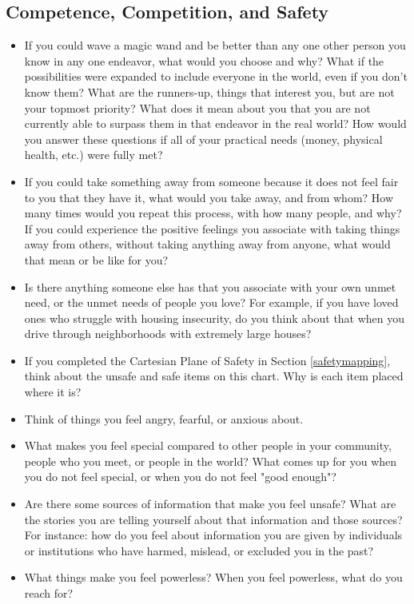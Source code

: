 \documentclass[12pt,letterpaper]{book}
\begin{document}
\subsection*{Competence, Competition, and Safety}
\begin{itemize}
    \item If you could wave a magic wand and be better than any one other person you know in any one endeavor, what would you choose and why? What if the possibilities were expanded to include everyone in the world, even if you don't know them? What are the runners-up, things that interest you, but are not your topmost priority? What does it mean about you that you are not currently able to surpass them in that endeavor in the real world? How would you answer these questions if all of your practical needs (money, physical health, etc.) were fully met?
    \item If you could take something away from someone because it does not feel fair to you that they have it, what would you take away, and from whom? How many times would you repeat this process, with how many people, and why? If you could experience the positive feelings you associate with taking things away from others, without taking anything away from anyone, what would that mean or be like for you?
    \item Is there anything someone else has that you associate with your own unmet need, or the unmet needs of people you love? For example, if you have loved ones who struggle with housing insecurity, do you think about that when you drive through neighborhoods with extremely large houses?
    \item If you completed the Cartesian Plane of Safety in Section \ref{safetymapping}, think about the unsafe and safe items on this chart. Why is each item placed where it is?
    \item Think of things you feel angry, fearful, or anxious about. 
    \item What makes you feel special compared to other people in your community, people who you meet, or people in the world? What comes up for you when you do not feel special, or when you do not feel "good enough"?
    \item Are there some sources of information that make you feel unsafe? What are the stories you are telling yourself about that information and those sources? For instance: how do you feel about information you are given by individuals or institutions who have harmed, mislead, or excluded you in the past?
    \item What things make you feel powerless? When you feel powerless, what do you reach for?

\end{itemize}
\end{document}
